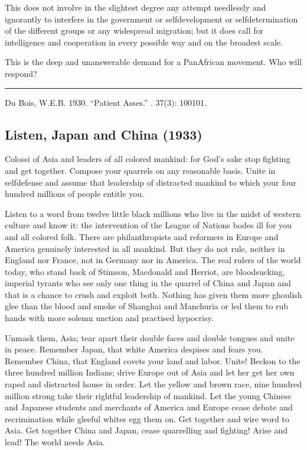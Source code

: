 \documentclass[letterpaper,10pt,english]{jupyterBook}
\begin{document}
\sphinxAtStartPar
This does not involve in the slightest degree any attempt needlessly and ignorantly to interfere in the government or self\sphinxhyphen{}development or self\sphinxhyphen{}determination of the different groups or any widespread migration; but it does call for intelligence and co\sphinxhyphen{}operation in every possible way and on the broadest scale.

\sphinxAtStartPar
This is the deep and unanswerable demand for a Pan\sphinxhyphen{}African movement. Who will respond?


\bigskip\hrule\bigskip


\sphinxAtStartPar
{} Du Bois, W.E.B. 1930. “Patient Asses.” . 37(3): 100\sphinxhyphen{}101.


\subsection{Listen, Japan and China (1933)}
\label{\detokenize{Volumes/40/01/listen_japan_and_china:listen-japan-and-china-1933}}\label{\detokenize{Volumes/40/01/listen_japan_and_china::doc}}
\sphinxAtStartPar
Colossi of Asia and leaders of all colored mankind: for God’s sake stop fighting and get together. Compose your quarrels on any reasonable basis. Unite in self\sphinxhyphen{}defense and assume that leadership of distracted mankind to which your four hundred millions of people entitle you.

\sphinxAtStartPar
Listen to a word from twelve little black millions who live in the midst of western culture and know it: the intervention of the League of Nations bodes ill for you and all colored folk. There are philanthropists and reformers in Europe and America genuinely interested in all mankind. But they do not rule, neither in England nor France, not in Germany nor in America. The real rulers of the world today, who stand back of Stimson, Macdonald and Herriot, are blood\sphinxhyphen{}sucking, imperial tyrants who see only one thing in the quarrel of China and Japan and that is a chance to crush and exploit both. Nothing has given them more ghoulish glee than the blood and smoke of Shanghai and Manchuria or led them to rub hands with more solemn unction and practised hypocrisy.

\sphinxAtStartPar
Unmask them, Asia; tear apart their double faces and double tongues and unite in peace. Remember Japan, that white America despises and fears you. Remember China, that England covets your land and labor. Unite! Beckon to the three hundred million Indians; drive Europe out of Asia and let her get her own raped and distracted house in order. Let the yellow and brown race, nine hundred million strong take their rightful leadership of mankind. Let the young Chinese and Japanese students and merchants of America and Europe cease debate and recrimination while gleeful whites egg them on. Get together and wire word to Asia. Get together China and Japan, cease quarrelling and fighting! Arise and lead! The world needs Asia.
\end{document}
